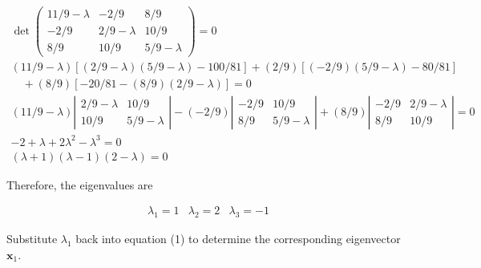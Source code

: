 \documentclass[12pt]{article}
\begin{document}
\begin{equation*}
	\begin{array}{c}
		\operatorname{det}\left(\begin{array}{ccc}
				11 / 9-\lambda & -2 / 9        & 8 / 9         \\
				-2 / 9         & 2 / 9-\lambda & 10 / 9        \\
				8 / 9          & 10 / 9        & 5 / 9-\lambda
			\end{array}\right)=0                                                                                            \\
		(11 / 9-\lambda)[(2 / 9-\lambda)(5 / 9-\lambda)-100 / 81]+(2 / 9)[(-2 / 9)(5 / 9-\lambda)-80 / 81]                                                    \\
		\quad+(8 / 9)[-20 / 81-(8 / 9)(2 / 9-\lambda)]=0                                                                                                      \\
		(11 / 9-\lambda)\left|\begin{array}{cc}
			2 / 9-\lambda & 10 / 9        \\
			10 / 9        & 5 / 9-\lambda
		\end{array}\right|-(-2 / 9)\left|\begin{array}{cc}
			-2 / 9 & 10 / 9        \\
			8 / 9  & 5 / 9-\lambda
		\end{array}\right|+(8 / 9)\left|\begin{array}{cc}
			-2 / 9 & 2 / 9-\lambda \\
			8 / 9  & 10 / 9
		\end{array}\right|=0 \\
		-2+\lambda+2 \lambda^{2}-\lambda^{3}=0                                                                                                                \\
		(\lambda+1)(\lambda-1)(2-\lambda)=0
	\end{array}
\end{equation*}

Therefore, the eigenvalues are

\begin{equation*}
	\begin{array}{|l|l|l|}
		\hline \lambda_{1}=1 & \lambda_{2}=2 & \lambda_{3}=-1
	\end{array}
\end{equation*}

Substitute \(\lambda_{1}\) back into equation (1) to determine the corresponding
eigenvector \(\mathbf{x}_{1}\). 
\end{document}
